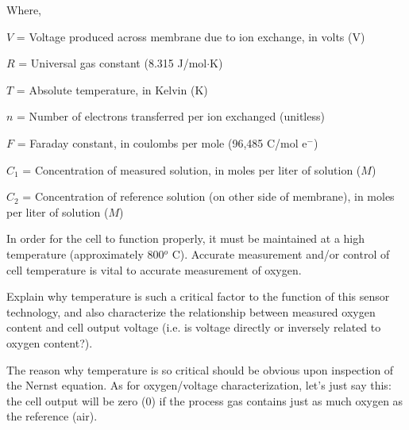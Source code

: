 \noindent
Where,

$V$ = Voltage produced across membrane due to ion exchange, in volts (V)

$R$ = Universal gas constant (8.315 J/mol$\cdot$K)

$T$ = Absolute temperature, in Kelvin (K)

$n$ = Number of electrons transferred per ion exchanged (unitless)

$F$ = Faraday constant, in coulombs per mole (96,485 C/mol e$^{-}$)

$C_1$ = Concentration of measured solution, in moles per liter of solution ($M$)

$C_2$ = Concentration of reference solution (on other side of membrane), in moles per liter of solution ($M$)

\vskip 10pt

In order for the cell to function properly, it must be maintained at a high temperature (approximately 800$^{o}$ C).  Accurate measurement and/or control of cell temperature is vital to accurate measurement of oxygen.

\vskip 10pt

Explain why temperature is such a critical factor to the function of this sensor technology, and also characterize the relationship between measured oxygen content and cell output voltage (i.e. is voltage directly or inversely related to oxygen content?).







The reason why temperature is so critical should be obvious upon inspection of the Nernst equation.  As for oxygen/voltage characterization, let's just say this: the cell output will be zero (0) if the process gas contains just as much oxygen as the reference (air).











